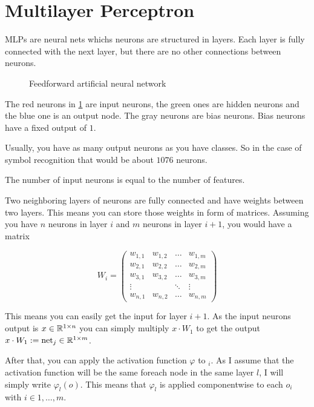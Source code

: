 \section{Multilayer Perceptron}\label{ch:Content2:sec:Section2}

\Glspl{MLP} are neural nets whichs neurons are structured in layers.
Each layer is fully connected with the next layer, but there are no other
connections between neurons.

\begin{figure}[ht]
    \centering
    
    \caption{Feedforward artificial neural network}
    \label{fig:feedforward}
\end{figure}

The red neurons in \cref{fig:feedforward} are input neurons, the green ones are
hidden neurons and the blue one is an output node. The gray neurons are bias neurons.
Bias neurons have a fixed output of $1$.

Usually, you have as many output neurons as you have classes. So in the case of
symbol recognition that would be about $\si{1076}$ neurons.

The number of input neurons is equal to the number of features.

Two neighboring layers of neurons are fully connected and have weights between
two layers. This means you can store those weights in form of matrices.
Assuming you have $n$ neurons in layer $i$ and $m$ neurons in layer $i + 1$,
you would have a matrix

\[W_{i} = \begin{pmatrix}
    w_{1,1} & w_{1,2} & \dots & w_{1,m}\\
    w_{2,1} & w_{2,2} & \dots & w_{2,m}\\
    w_{3,1} & w_{3,2} & \dots & w_{3,m}\\
    \vdots  &         & \ddots& \vdots \\
    w_{n,1} & w_{n,2} & \dots & w_{n,m}
\end{pmatrix}\]

This means you can easily get the input for layer $i+1$. As the input neurons
output is $x \in \mathbb{R}^{1 \times n}$ you can simply multiply $x \cdot W_1$
to get the output $x \cdot W_1 := \mathrm{net}_j \in \mathbb{R}^{1 \times m}$.

After that, you can apply the activation function $\varphi$ to $_i$.
As I assume that the activation function will be the same foreach node in the
same layer $l$, I will simply write $\varphi_l(o)$. This means that $\varphi_l$ is applied
componentwise to each $o_i$ with $i \in 1, \dots, m$.

